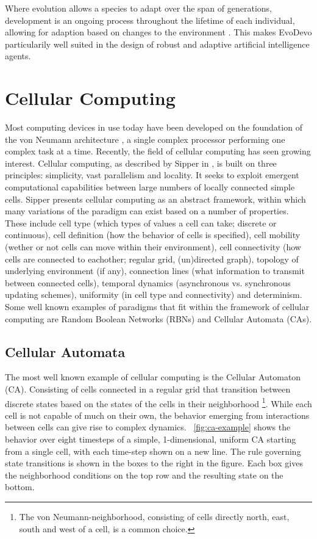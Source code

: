 Where evolution allows a species to adapt over the span of generations,
development is an ongoing process throughout the lifetime of each individual,
allowing for adaption based on changes to the environment \cite{Tufte2008}. This makes EvoDevo
particularily well suited in the design of robust and adaptive artificial
intelligence agents.

\section{Cellular Computing}
\label{sec:cellular-computing}

Most computing devices in use today have been developed on the foundation of the
von Neumann architecture \cite{VonNeumann1993}, a single complex processor
performing one complex task at a time. Recently, the field of cellular computing
has seen growing interest. Cellular computing, as described by Sipper in
\cite{Sipper1999}, is built on three principles: simplicity, vast parallelism
and locality. It seeks to exploit emergent computational capabilities between
large numbers of locally connected simple cells. Sipper presents cellular
computing as an abstract framework, within which many variations of the paradigm
can exist based on a number of properties. These include cell type (which types
of values a cell can take; discrete or continuous), cell definition (how the
behavior of cells is specified), cell mobility (wether or not cells can move
within their environment), cell connectivity (how cells are connected to
eachother; regular grid, (un)directed graph), topology of underlying environment
(if any), connection lines (what information to transmit between connected
cells), temporal dynamics (asynchronous vs. synchronous updating schemes),
uniformity (in cell type and connectivity) and determinism. Some well known
examples of paradigms that fit within the framework of cellular computing are
Random Boolean Networks (RBNs) and Cellular Automata (CAs).

\subsection{Cellular Automata}

The most well known example of cellular computing is the Cellular Automaton
(CA). Consisting of cells connected in a regular grid that transition between
discrete states based on the states of the cells in their neighborhood
\footnote{The von Neumann-neighborhood, consisting of cells directly north,
east, south and west of a cell, is a common choice.}. While each cell is not
capable of much on their own, the behavior emerging from interactions between
cells can give rise to complex dynamics. \figurename~\ref{fig:ca-example} shows
the behavior over eight timesteps of a simple, 1-dimensional, uniform CA
starting from a single cell, with each time-step shown on a new line. The rule
governing state transitions is shown in the boxes to the right in the figure.
Each box gives the neighborhood conditions on the top row and the resulting
state on the bottom.


